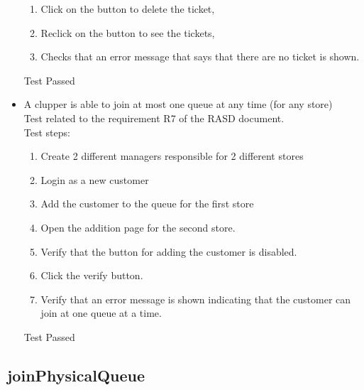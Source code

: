 \begin{itemize}
\begin{enumerate}
        \item Click on the button to delete the ticket,

        \item Reclick on the button to see the tickets,

        \item Checks that an error message that says that there are no ticket is shown.
    \end{enumerate}
    Test Passed

    \item A clupper is able to join at most one queue at any time (for any store)\\
    Test related to the requirement R7 of the RASD document.\\
    Test steps:\\
    \begin{enumerate}
        \item Create 2 different managers responsible for 2 different stores
        \item Login as a new customer
        \item Add the customer to the queue for the first store
        \item Open the addition page for the second store.
        \item Verify that the button for adding the customer is disabled.
        \item Click the verify button.
        \item Verify that an error message is shown indicating that the customer can join at one queue at a time.
    \end{enumerate}
    Test Passed
\end{itemize}

\subsection{joinPhysicalQueue}

